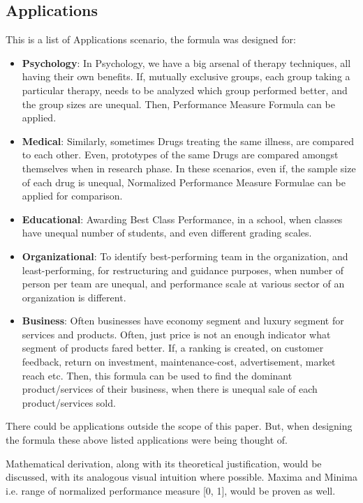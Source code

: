 \documentclass[a4paper,fleqn,review]{cas-sc}
\begin{document}
\subsection{Applications}
This is a list of Applications scenario, the formula was designed for:
\begin{itemize}
	\item \textbf{Psychology}: In Psychology, we have a big arsenal of therapy techniques, all having their own benefits. If, mutually exclusive groups, each group taking a particular therapy, needs to be analyzed which group performed better, and the group sizes are unequal. Then, Performance Measure Formula can be applied.
	\item \textbf{Medical}: Similarly, sometimes Drugs treating the same illness, are compared to each other. Even, prototypes of the same Drugs are compared amongst themselves when in research phase. In these scenarios, even if, the sample size of each drug is unequal, Normalized Performance Measure Formulae can be applied for comparison.
    \item \textbf{Educational}: Awarding Best Class Performance, in a school, when classes have unequal number of students, and even different grading scales.
    \item \textbf{Organizational}: To identify best-performing team in the organization, and least-performing, for restructuring and guidance purposes, when number of person per team are unequal, and performance scale at various sector of an organization is different.
   \item \textbf{Business}: Often businesses have economy segment and luxury segment for services and products. Often, just price is not an enough indicator what segment of products fared better. If, a ranking is created, on customer feedback, return on investment, maintenance-cost, advertisement, market reach etc. Then, this formula can be used to find the dominant product/services of their business, when there is unequal sale of each product/services sold.
\end{itemize}
There could be applications outside the scope of this paper. But, when designing the formula these above listed applications were being thought of.

\hfill \break
Mathematical derivation, along with its theoretical justification, would be discussed, with its analogous visual intuition where possible. Maxima and Minima i.e. range of normalized performance measure [0, 1], would be proven as well.
\end{document}
